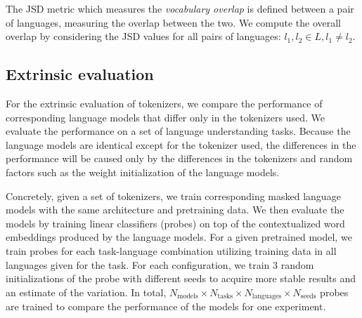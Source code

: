 The JSD metric which measures the \textit{vocabulary overlap} is defined between a pair of languages, measuring the overlap between the two. We compute the overall overlap by considering the JSD values for all pairs of languages: $l_1, l_2 \in L, l_1 \neq l_2$.

\subsection{Extrinsic evaluation}
\label{sec:extrinsic_evaluation}

For the extrinsic evaluation of tokenizers, we compare the performance of corresponding language models that differ only in the tokenizers used.
We evaluate the performance on a set of language understanding tasks.
Because the language models are identical except for the tokenizer used, the differences in the performance will be caused only by the differences in the tokenizers and random factors such as the weight initialization of the language models.

Concretely, given a set of tokenizers, we train corresponding masked language models with the same architecture and pretraining data.
 We then evaluate the models by training linear classifiers (probes) on top of the contextualized word embeddings produced by the language models. 
 For a given pretrained model, we train probes for each task-language combination utilizing training data in all languages given for the task.
 For each configuration, we train 3 random initializations of the probe with different seeds to acquire more stable results and an estimate of the variation. In total, $N_\mathrm{models} \times N_\mathrm{tasks} \times N_\mathrm{languages} \times N_\mathrm{seeds}$ probes are trained to compare the performance of the models for one experiment.

